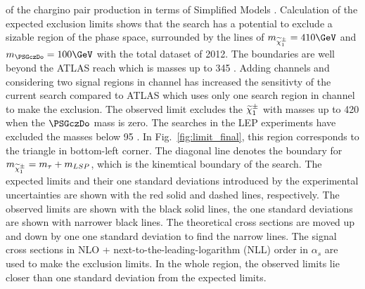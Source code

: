 of the chargino pair production in terms of Simplified Models \cite{alves:sms}. 
Calculation of the expected exclusion limits shows that the search has a potential to exclude 
a sizable region of the phase space, surrounded by the lines of $m_{\chione} = 410\GeV$ and $m_{\PSGczDo} = 100\GeV$ with 
the total dataset of 2012. The boundaries are well beyond the ATLAS reach which is \chione  masses up to 345 \GeV \cite{Aad:2014yka}.
Adding \leptonTau channels
and considering two signal regions in \tauTau channel has increased the sensitivty of the current search compared to ATLAS which uses only 
one search region in \tauTau channel to make the exclusion.
The observed limit excludes the $\widetilde{\chi}^{\pm}_1$ with masses up to 420 \GeV when the $\PSGczDo$ mass is zero.
The \sTau searches in the LEP experiments \cite{lepsusy} have excluded the masses below 95 \GeV. In Fig.~\ref{fig:limit_final}, 
this region corresponds to the triangle in bottom-left corner.
The diagonal line denotes the boundary for $m_{\widetilde{\chi}^{\pm}_1} = m_{\tau} + m_{LSP}$, which is the kinemtical boundary of the search.
The expected limits and their one standard deviations introduced by the experimental 
uncertainties are shown with the red solid and dashed lines, respectively. The observed limits are shown with the black solid lines, the one 
standard deviations are shown with narrower black lines. The theoretical cross sections are moved up and down by one one standard deviation to 
find the narrow lines.
The signal cross sections in NLO + next-to-the-leading-logarithm (NLL) order in $\alpha_s$ are used to make the exclusion limits.
In the whole region, the observed limits lie closer than one standard deviation from the expected limits.  
